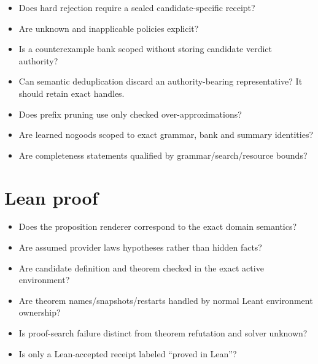 \documentclass[11pt,oneside]{report}
\begin{document}
\begin{itemize}[leftmargin=2em]
\item Does hard rejection require a sealed candidate-specific receipt?
\item Are unknown and inapplicable policies explicit?
\item Is a counterexample bank scoped without storing candidate verdict authority?
\item Can semantic deduplication discard an authority-bearing representative? It should retain exact handles.
\item Does prefix pruning use only checked over-approximations?
\item Are learned nogoods scoped to exact grammar, bank and summary identities?
\item Are completeness statements qualified by grammar/search/resource bounds?
\end{itemize}

\section{Lean proof}

\begin{itemize}[leftmargin=2em]
\item Does the proposition renderer correspond to the exact domain semantics?
\item Are assumed provider laws hypotheses rather than hidden facts?
\item Are candidate definition and theorem checked in the exact active environment?
\item Are theorem names/snapshots/restarts handled by normal Leant environment ownership?
\item Is proof-search failure distinct from theorem refutation and solver unknown?
\item Is only a Lean-accepted receipt labeled ``proved in Lean''?
\end{itemize}
\end{document}
